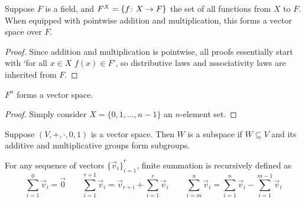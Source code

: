 \begin{proposition}
    Suppose \(F\) is a field,
    and \(F^X = \{f\colon X\to F\}\) the set of all functions from \(X\) to \(F\).
    When equipped with pointwise addition and multiplication,
    this forms a vector space over \(F\).
\end{proposition}
\begin{proof}
    Since addition and multiplication is pointwise,
    all proofs essentially start with `for all \(x \in X\) \(f(x) \in F\)',
    so distributive laws and associativity laws are inherited from \(F\).
\end{proof}
\begin{corollary}
    \(F^n\) forms a vector space.
\end{corollary}
\begin{proof}
    Simply consider \(X = \{0,1,\hdots,n-1\}\) an \(n\)-element set.
\end{proof}

\begin{definition}
    Suppose \((V,+,\cdot,0,1)\) is a vector space.
    Then \(W\) is a subspace if \(W \subseteq V\)
    and its additive and multiplicative groups form subgroups.
\end{definition}

\begin{definition}
    For any sequence of vectors \({\{\vec{v}_i\}}_{i=1}^r\),
    finite summation is recursively defined as
    \begin{equation*}
        \sum_{i=1}^0 \vec{v}_i = \vec{0} \qquad
        \sum_{i=1}^{r+1} \vec{v}_i = \vec{v}_{r+i} + \sum_{i=1}^r \vec{v}_i \qquad
        \sum_{i=m}^n \vec{v}_i = \sum_{i=1}^n \vec{v}_i - \sum_{i=1}^{m-1} \vec{v}_i
    \end{equation*}
\end{definition}

